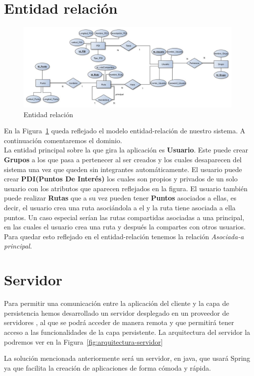 \section{Entidad relación}
\begin{figure}[H]
		\centering
		\includegraphics[width=\textwidth] {BD.jpg}
		\caption{Entidad relación  }\label{fig:BD}
	\end{figure}
	En la Figura~\ref{fig:BD} queda reflejado el modelo  entidad-relación de nuestro sistema. A continuación comentaremos el dominio.\\
La entidad principal sobre la que gira la aplicación es \textbf{Usuario}. Este puede crear \textbf{Grupos} a los que pasa a pertenecer al ser creados y los cuales desaparecen del sistema una vez que queden sin integrantes automáticamente.  El usuario puede crear \textbf{PDI(Puntos De Interés)} los cuales son propios y privados de un solo usuario con los atributos que aparecen reflejados en la figura. El usuario también puede realizar \textbf{Rutas} que a su vez pueden tener \textbf{Puntos} asociados a ellas, es decir, el  usuario crea una ruta asociándola a el y la ruta tiene asociada a ella puntos.
 Un caso especial serían las rutas compartidas asociadas a una principal, en las cuales el usuario crea una ruta y después la compartes con otros usuarios. Para  quedar esto reflejado en el entidad-relación tenemos la relación \textit{Asociada-a principal}.
	
\section{Servidor}
Para permitir una comunicación entre la aplicación del cliente y la capa de persistencia hemos desarrollado un servidor desplegado en un proveedor de servidores , al que se podrá acceder de manera remota y que permitirá tener acceso a las funcionalidades de la capa persistente. La arquitectura del servidor la podremos ver en la Figura~\ref{fig:arquitectura-servidor}

La solución mencionada anteriormente será un servidor, en java, que  usará Spring ya que facilita la creación de aplicaciones de forma cómoda y rápida.\\

